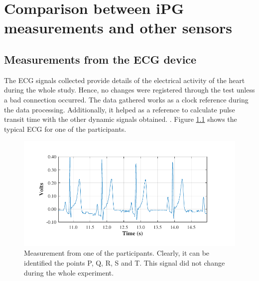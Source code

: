 
\chapter{Comparison between iPG measurements and other sensors}  %

\ifpdf
\graphicspath{{Chapter9/Figs/Raster/}{Chapter9/Figs/PDF/}{Chapter9/Figs/}}
\else
\graphicspath{{Chapter9/Figs/Vector/}{Chapter9/Figs/}}
\fi


\section{Measurements from the ECG device}
\label{section comparison 4}
The ECG signals collected provide details of the electrical activity of the heart during the whole study. Hence, no changes were registered through the test unless a bad connection occurred. The data gathered works as a clock reference during the data processing. Additionally, it helped as a reference to calculate pulse transit time with the other dynamic signals obtained. . Figure \ref{fig:ECG} shows the typical ECG for one of the participants.

\begin{figure}[!htbp]
	\centering
	\includegraphics{figure19}    
	\caption[ECG measurement acquired by the system]{Measurement from one of the participants. Clearly, it can be identified the points P, Q, R, S and T. This signal did not change during the whole experiment.}
	\label{fig:ECG}
\end{figure} 

